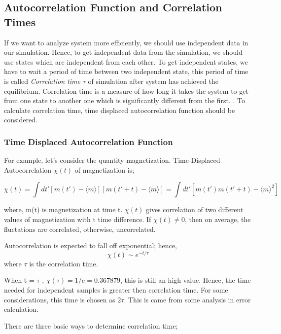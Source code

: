 \documentclass[12pt,fleqn]{report}
\begin{document}
\subsection{Autocorrelation Function and Correlation Times}

If we want to analyze system more efficiently, we should use independent data in our simulation. Hence, to get independent data from the simulation, we should use states which are independent from each other. To get independent states, we have to wait a period of time between two independent state, this period of time is called  \textit{Correlation time} $\tau$ of simulation after system has achieved the equilibrium. Correlation time is a measure of how long it takes the system to get from one state to another one which is significantly different from the first. \cite[p. 59] {newman}. To calculate correlation time, time displaced autocorrelation function should be considered.

\subsubsection{Time Displaced Autocorrelation Function}

For example, let's consider the quantity magnetization. Time-Displaced Autocorrelation $\chi (t)$ of magnetization is;

\begin{equation}
\chi (t) = \int dt' [m(t') - \langle m\rangle][m(t' + t) - \langle m\rangle] = \int dt'[m(t')m(t' + t) - {\langle m\rangle}^2]
\end{equation}

where, m(t) is magnetization at time t.  $\chi (t) $ gives correlation of two different values of magnetization with t time difference. If $\chi (t) \neq 0$, then on average, the fluctations are correlated, otherwise, uncorrelated. 

Autocorrelation is expected to fall off exponential; hence,
\begin{equation}
\chi (t) \sim e^{-t/ \tau}
\end{equation}
where $\tau$ is the correlation time.

When t = $\tau$ , $\chi (\tau) = 1/e = 0.367879 $, this is still an high value.  Hence, the time needed for independent samples is greater then correlation time. For some considerations, this time is chosen as $2\tau$. This is came from some analysis in error calculation.

There are three basic ways to determine correlation time;
\end{document}
